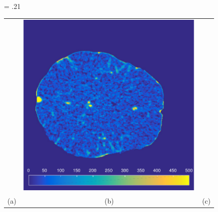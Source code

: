 \documentclass[final,5p,times,twocolumn]{elsarticle}
\begin{document}
	\begin{figure}[]
		\fwd = .21\textwidth
		\centering
		\begin{tabular}{ccc}
		 {\small} & \includegraphics[width = \fwd]{./figs/real_axial160.pdf} & {\small} \\
		 (a) & (b) & (c) 
		\end{tabular}
		\caption*{}
	\label{fig:RealDataFIG}
	\end{figure}
\end{document}
